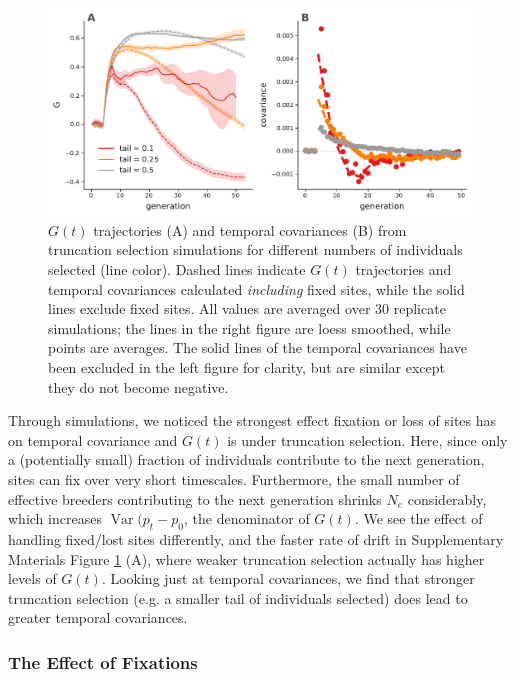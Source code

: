 \documentclass[11pt]{article}
\DeclareMathOperator{\var}{Var}
\begin{document}
{{\begin{figure}[!ht]
  \centering
  \includegraphics[width=\textwidth]{figures/fig-both-trunc.pdf}

  \caption{$G(t)$ trajectories (A) and temporal covariances (B) from
    truncation selection simulations for different numbers of individuals
    selected (line color). Dashed lines indicate $G(t)$ trajectories and
    temporal covariances calculated \emph{including} fixed sites, while the
    solid lines exclude fixed sites. All values are averaged over 30 replicate
    simulations; the lines in the right figure are loess smoothed, while points
    are averages. The solid lines of the temporal covariances have been
    excluded in the left figure for clarity, but are similar except they do not
    become negative.}

    \label{suppfig:supp-trunc}
\end{figure}

Through simulations, we noticed the strongest effect fixation  or loss of sites
has on temporal covariance and $G(t)$ is under truncation selection. Here,
since only a (potentially small) fraction of individuals contribute to the next
generation, sites can fix over very short timescales. Furthermore, the small
number of effective breeders contributing to the next generation shrinks $N_e$
considerably, which increases $\var(p_t - p_0$, the denominator of $G(t)$. We
see the effect of handling fixed/lost sites differently, and the faster rate of
drift in Supplementary Materials Figure \ref{suppfig:supp-trunc} (A), where
weaker truncation selection actually has higher levels of $G(t)$. Looking just
at temporal covariances, we find that stronger truncation selection (e.g.  a
smaller tail of individuals selected) does lead to greater temporal
covariances.


\subsubsection{The Effect of Fixations}
\label{supp:fixation}

}}
\end{document}
